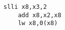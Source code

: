 \documentclass[varwidth]{standalone}
\begin{document}
  \begin{BVerbatim}[gobble=4]
    slli x8,x3,2
    add x8,x2,x8
    lw x8,0(x8)
  \end{BVerbatim}
\end{document}
